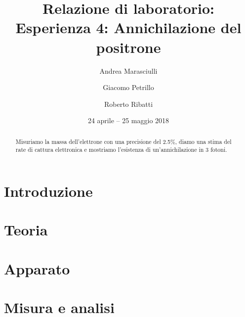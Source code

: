 \documentclass[a4paper]{article}
\title{Relazione di laboratorio:\\
Esperienza 4: Annichilazione del positrone}
\author{Andrea Marasciulli
\and Giacomo Petrillo
\and Roberto Ribatti}
\date{24 aprile -- 25 maggio 2018}
\begin{document}
\maketitle

\begin{abstract}

Misuriamo la massa dell'elettrone con una precisione del 2.5\%, diamo una stima del rate di cattura elettronica e mostriamo l'esistenza di un'annichilazione in 3 fotoni.

\end{abstract}

{\tableofcontents}

\newpage
\section{Introduzione}




\section{Teoria}



\section{Apparato}





\section{Misura e analisi}























\end{document}

